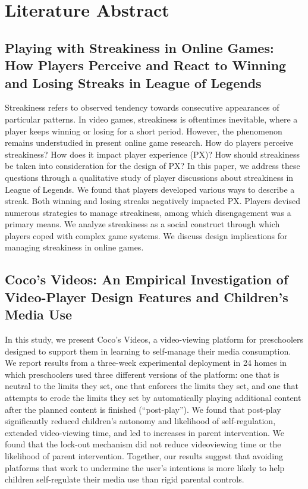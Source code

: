 \section{Literature Abstract}


\subsection{Playing with Streakiness in Online Games: How Players
Perceive and React to Winning and Losing Streaks in
League of Legends }

Streakiness refers to observed tendency towards
consecutive appearances of particular patterns. In video
games, streakiness is oftentimes inevitable, where a player
keeps winning or losing for a short period. However, the
phenomenon remains understudied in present online game
research. How do players perceive streakiness? How does it
impact player experience (PX)? How should streakiness be
taken into consideration for the design of PX? In this paper,
we address these questions through a qualitative study of
player discussions about streakiness in League of Legends.
We found that players developed various ways to describe a
streak. Both winning and losing streaks negatively impacted
PX. Players devised numerous strategies to manage
streakiness, among which disengagement was a primary
means. We analyze streakiness as a social construct through
which players coped with complex game systems. We
discuss design implications for managing streakiness in
online games.

\subsection{Coco’s Videos: An Empirical Investigation of Video-Player
Design Features and Children's Media Use }

In this study, we present Coco’s Videos, a video-viewing
platform for preschoolers designed to support them in learning to self-manage their media consumption. We report results from a three-week experimental deployment in 24
homes in which preschoolers used three different versions of
the platform: one that is neutral to the limits they set, one that
enforces the limits they set, and one that attempts to erode
the limits they set by automatically playing additional content after the planned content is finished (“post-play”). We
found that post-play significantly reduced children’s autonomy and likelihood of self-regulation, extended video-viewing time, and led to increases in parent intervention. We
found that the lock-out mechanism did not reduce videoviewing time or the likelihood of parent intervention. Together, our results suggest that avoiding platforms that work
to undermine the user’s intentions is more likely to help children self-regulate their media use than rigid parental controls.


